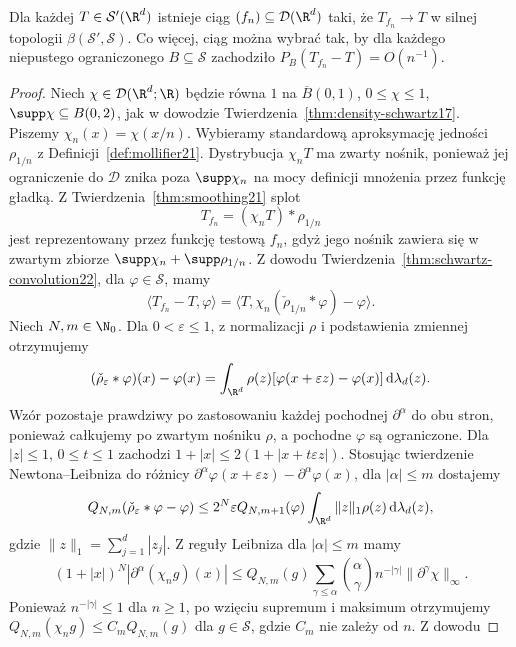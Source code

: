 \begin{twierdzenie}
\label{thm:dt-tempered-test-density}
Dla każdej $T\in\mathcal S'(\R^d)$ istnieje ciąg
$(f_n)\subseteq\mathcal D(\R^d)$ taki, że
$T_{f_n}\to T$ w silnej topologii $\beta(\mathcal S',\mathcal S)$.
Co więcej, ciąg można wybrać tak, by dla każdego
niepustego ograniczonego $B\subseteq\mathcal S$
zachodziło $P_B(T_{f_n}-T)=O(n^{-1})$.
\end{twierdzenie}
\begin{proof}
Niech $\chi\in\mathcal D(\R^d;\R)$ będzie równa $1$
na $\overline B(0,1)$, $0\le\chi\le1$,
$\supp\chi\subseteq B(0,2)$, jak w dowodzie
Twierdzenia~\ref{thm:density-schwartz17}.
Piszemy $\chi_n(x)=\chi(x/n)$. Wybieramy standardową
aproksymację jedności $\rho_{1/n}$ z
Definicji~\ref{def:mollifier21}.
Dystrybucja $\chi_nT$ ma zwarty nośnik, ponieważ jej
ograniczenie do $\mathcal D$ znika poza $\supp\chi_n$
na mocy definicji mnożenia przez funkcję gładką.
Z Twierdzenia~\ref{thm:smoothing21} splot
\[
 T_{f_n}=(\chi_nT)*\rho_{1/n}
\]
jest reprezentowany przez funkcję testową $f_n$,
gdyż jego nośnik zawiera się w zwartym zbiorze
$\supp\chi_n+\supp\rho_{1/n}$.
Z dowodu Twierdzenia~\ref{thm:schwartz-convolution22},
dla $\varphi\in\mathcal S$, mamy
\[
 \langle T_{f_n}-T,\varphi\rangle
 =\langle T,\chi_n(\check\rho_{1/n}*\varphi)-\varphi\rangle.
\]
Niech $N,m\in\N_0$. Dla $0<\varepsilon\le1$,
z normalizacji $\rho$ i podstawienia zmiennej otrzymujemy
\[
 (\check\rho_\varepsilon*\varphi)(x)-\varphi(x)
 =\int_{\R^d}\rho(z)
 [\varphi(x+\varepsilon z)-\varphi(x)]\,\mathrm d\lambda_d(z).
\]
Wzór pozostaje prawdziwy po zastosowaniu każdej pochodnej
$\partial^\alpha$ do obu stron, ponieważ całkujemy po
zwartym nośniku $\rho$, a pochodne $\varphi$ są ograniczone.
Dla $|z|\le1$, $0\le t\le1$ zachodzi
$1+|x|\le2(1+|x+t\varepsilon z|)$.
Stosując twierdzenie Newtona--Leibniza do różnicy
$\partial^\alpha\varphi(x+\varepsilon z)
-\partial^\alpha\varphi(x)$, dla $|\alpha|\le m$ dostajemy
\[
 Q_{N,m}(\check\rho_\varepsilon*\varphi-\varphi)
 \le 2^N\varepsilon Q_{N,m+1}(\varphi)
 \int_{\R^d}\|z\|_1\rho(z)\,\mathrm d\lambda_d(z),
\]
gdzie $\|z\|_1=\sum_{j=1}^d|z_j|$.
Z reguły Leibniza dla $|\alpha|\le m$ mamy
\[
 (1+|x|)^N|\partial^\alpha(\chi_n g)(x)|
 \le Q_{N,m}(g)\sum_{\gamma\le\alpha}
 \binom{\alpha}{\gamma}n^{-|\gamma|}
 \|\partial^\gamma\chi\|_\infty.
\]
Ponieważ $n^{-|\gamma|}\le1$ dla $n\ge1$, po wzięciu
supremum i maksimum otrzymujemy
$Q_{N,m}(\chi_n g)\le C_m Q_{N,m}(g)$
dla $g\in\mathcal S$, gdzie $C_m$ nie zależy od $n$. Z dowodu

\end{proof}
